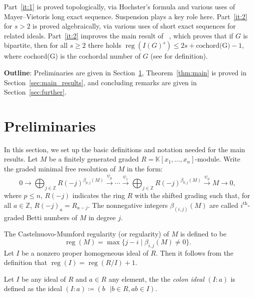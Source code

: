 \documentclass[10pt]{article}
\theoremstyle{definition}
\numberwithin{equation}{section}
\newcommand \reg{\operatorname{reg}}
\newcommand \K{\mathbb{K}}
\begin{document}
Part~\ref{it:1} is proved topologically, via Hochster's formula and various uses of Mayer--Vietoris long exact sequence. Suspension plays a key role here. Part~\ref{it:2} for $s>2$ is proved algebraically, via various uses of short exact sequences for related ideals. Part~\ref{it:2} improves the main result of ~\cite{jayanthan}, which proves that if $G$ is bipartite, then for all $s\geq 2$  there holds $\reg(I(G)^s) \leq 2s+\text{cochord(G)}-1$, where cochord(G) is the cochordal number of $G$ (see \cite{jayanthan} for definition).

\textbf{Outline}: Preliminaries are given in Section~\ref{pre}, Theorem~\ref{thm:main} is proved in Section~\ref{sec:main_results}, and concluding remarks are given in Section~\ref{sec:further}.


\section{Preliminaries}\label{pre}
  In this section, we set up the basic definitions and notation needed for the main results. Let $M$ be a finitely generated graded $R=\K[x_1,\ldots,x_n]$-module.
Write the graded minimal free resolution of $M$ in the form:
\[
  0 \longrightarrow \bigoplus_{j \in \mathbb{Z}} R(-j)^{\beta_{p,j}(M)}
\overset{\psi_{p}}{\longrightarrow} \cdots \overset{\psi_1}{\longrightarrow}
\bigoplus_{j \in \mathbb{Z}} R(-j)^{\beta_{0,j}(M)}
\overset{\psi_0}{\longrightarrow} M\longrightarrow 0,
 \]
 where $p \leq n$, $R(-j)$ indicates the ring $R$ with the
shifted grading such that, for all $a \in \mathbb{Z}$, $R(-j)_{a}=R_{a-j}$.
The nonnegative integers $\beta_{(i,j)}(M)$ are called 
$i^{\text{th}}$-graded Betti numbers of $M$ in degree $j$.

The Castelnuovo-Mumford regularity (or regularity) of $M$ is defined to be
\[
 \reg(M)=\max\{j-i \mid \beta_{i,j}(M)\neq 0\}.\label{def_reg}
\]
  Let $I$ be a nonzero proper homogeneous ideal of $R$.
Then it follows from the definition
that $\reg(I) = \reg(R/I)+1.$

Let $I$ be any ideal of $R$ and $a\in R$ any element, the the \emph{colon ideal} $(I:a)$ is defined as the ideal $(I:a)\coloneqq (b \text{ } | b\in R, ab\in I)$.
\end{document}
